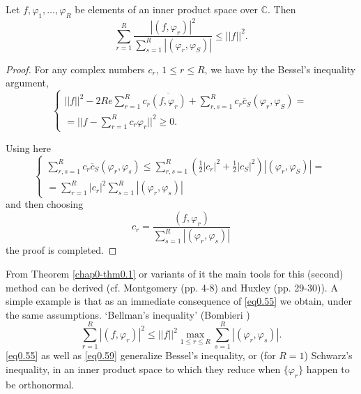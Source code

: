 \begin{theorem}\label{chap0-thm0.1}%
Let $f, \varphi_1 ,\ldots , \varphi_R$ be elements of an inner product
space over $\mathbb{C}$. Then
\begin{equation*}
\sum_{r=1}^R \frac{|(f , \varphi_r) |^2}{\sum_{s=1}^{R}|(\varphi_r,
  \varphi_S)|} \leq ||f||^2.\tag{0.55}\label{eq0.55} 
\end{equation*}
\end{theorem}

\begin{proof}%
For any complex numbers $c_r$, $1 \leq r \leq R$, we have by the
Bessel's inequality argument, 
\begin{equation*}
\begin{cases}
||f||^2 -2 Re \sum\limits_{r=1}^R c_r \overline{(f , \varphi_r)}
+ \sum\limits_{r,s=1}^R c_r \overline{c}_S(\varphi_r, \varphi_S)=\\ 
= || f- \sum\limits_{r=1}^{R} c_r \varphi_r || ^2 \ge 0.
\end{cases}\tag{0.56}\label{eq0.56}
\end{equation*}

Using here
\begin{equation*}
\begin{cases}
\sum\limits_{r,s=1}^R c_r \overline{c}_S
(\varphi_r, \varphi_s)\leq \sum\limits_{r,s=1}^R
(\frac{1}{2}|c_r|^2+ \frac{1}{2}|c_S|^2)|(\varphi_r, \varphi _S)|=\\ 
= \sum\limits_{r=1}^R |c_r|^2 \sum\limits^R_{s=1} |(\varphi _r, \varphi_s)|
\end{cases}\tag{0.57}\label{eq0.57}
\end{equation*}\pageoriginale
and then choosing 
\begin{equation*}
c_r = \frac{(f,\varphi_r)}{\sum\limits_{s=1}^R | ( \varphi_r , \varphi_s)|}
\tag{0.58}\label{eq0.58} 
\end{equation*}
the proof is completed.
\end{proof}

From Theorem \ref{chap0-thm0.1} or variants of it the main tools for
this (second) method can be derived (cf. Montgomery \cite{key5} (pp. 4-8)
and Huxley \cite{key7} (pp. 29-30)). A simple example is that as an
immediate consequence of \eqref{eq0.55} we obtain, under the same
assumptions. `Bellman's inequality' (Bombieri \cite{key3}) 
\begin{equation*}
 \sum_{r=1}^{R} |(f, \varphi _r )|^2 \leq ||f||^2 \underset{1 \leq
 r \leq R }\max \sum_{s=1}^R | (\varphi _r, \varphi _s
 )|.\tag{0.59}\label{eq0.59} 
\end{equation*}
\eqref{eq0.55} as well as \eqref{eq0.59} generalize Bessel's
inequality, or (for $R=1$) Schwarz's inequality, in an inner product
space to which they reduce when $\{ \varphi_r\}$ happen to be
orthonormal. 


